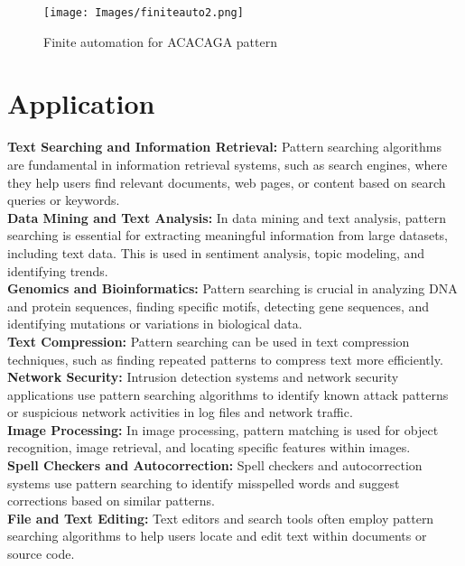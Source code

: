 \documentclass[11pt,a4paper]{article}
\begin{document}
\begin{figure}[H]
    \centering
    \texttt{[image: Images/finiteauto2.png]}
    \caption{Finite automation for ACACAGA pattern}
    \label{fig:StoringExample}
\end{figure}

\section*{Application}
\textbf{Text Searching and Information Retrieval:} Pattern searching algorithms are fundamental in information retrieval systems, such as search engines, where they help users find relevant documents, web pages, or content based on search queries or keywords.
\\
\textbf{Data Mining and Text Analysis:} In data mining and text analysis, pattern searching is essential for extracting meaningful information from large datasets, including text data. This is used in sentiment analysis, topic modeling, and identifying trends.
\\
\textbf{Genomics and Bioinformatics:} Pattern searching is crucial in analyzing DNA and protein sequences, finding specific motifs, detecting gene sequences, and identifying mutations or variations in biological data.
\\
\textbf{Text Compression:} Pattern searching can be used in text compression techniques, such as finding repeated patterns to compress text more efficiently.
\\
\textbf{Network Security:} Intrusion detection systems and network security applications use pattern searching algorithms to identify known attack patterns or suspicious network activities in log files and network traffic.
\\
\textbf{Image Processing:} In image processing, pattern matching is used for object recognition, image retrieval, and locating specific features within images.
\\
\textbf{Spell Checkers and Autocorrection: } Spell checkers and autocorrection systems use pattern searching to identify misspelled words and suggest corrections based on similar patterns.
\\
\textbf{File and Text Editing:} Text editors and search tools often employ pattern searching algorithms to help users locate and edit text within documents or source code.
\end{document}
